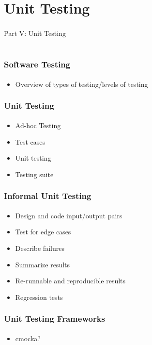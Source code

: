 \documentclass[]{beamer}
\begin{document}
\section{Unit Testing}

\begin{frame}
    \frametitle{}
    \framesubtitle{}
    
    \begin{center}
    {\Huge Part V: Unit Testing}\\
    {\Large ~}
    \end{center}

\end{frame}

\begin{frame}
    \frametitle{Software Testing}
    \framesubtitle{}

\begin{itemize}[<+->]
  \item Overview of types of testing/levels of testing
\end{itemize}

\end{frame}


\begin{frame}
    \frametitle{Unit Testing}
    \framesubtitle{}

\begin{itemize}[<+->]
  \item Ad-hoc Testing
  \item Test cases
  \item Unit testing
  \item Testing suite
\end{itemize}

\end{frame}

\begin{frame}
    \frametitle{Informal Unit Testing}
    \framesubtitle{}

\begin{itemize}[<+->]
  \item Design and code input/output pairs
  \item Test for edge cases
  \item Describe failures
  \item Summarize results
  \item Re-runnable and reproducible results
  \item Regression tests
\end{itemize}

\end{frame}


\begin{frame}
    \frametitle{Unit Testing Frameworks}
    \framesubtitle{}

\begin{itemize}[<+->]
  \item cmocka?
\end{itemize}

\end{frame}
\end{document}
